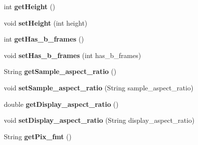 \begin{DoxyCompactItemize}
\item 
\hypertarget{classjson__objects_1_1_stream_a669b415d3fb5ae8a5c66bc0f460f10ef}{
int {\bfseries getHeight} ()}
\label{classjson__objects_1_1_stream_a669b415d3fb5ae8a5c66bc0f460f10ef}

\item 
\hypertarget{classjson__objects_1_1_stream_a0e166e17742eb929b1639e8476358048}{
void {\bfseries setHeight} (int height)}
\label{classjson__objects_1_1_stream_a0e166e17742eb929b1639e8476358048}

\item 
\hypertarget{classjson__objects_1_1_stream_a7ab7426c7256cac9f39df5bab45dcfd7}{
int {\bfseries getHas\_\-b\_\-frames} ()}
\label{classjson__objects_1_1_stream_a7ab7426c7256cac9f39df5bab45dcfd7}

\item 
\hypertarget{classjson__objects_1_1_stream_a0a262d5a8d253d92c65e2555ed3af657}{
void {\bfseries setHas\_\-b\_\-frames} (int has\_\-b\_\-frames)}
\label{classjson__objects_1_1_stream_a0a262d5a8d253d92c65e2555ed3af657}

\item 
\hypertarget{classjson__objects_1_1_stream_a18d2ee00376a811e9dbd370078a068b6}{
String {\bfseries getSample\_\-aspect\_\-ratio} ()}
\label{classjson__objects_1_1_stream_a18d2ee00376a811e9dbd370078a068b6}

\item 
\hypertarget{classjson__objects_1_1_stream_a1c2eb6d4f22435818bae44032cceb6d5}{
void {\bfseries setSample\_\-aspect\_\-ratio} (String sample\_\-aspect\_\-ratio)}
\label{classjson__objects_1_1_stream_a1c2eb6d4f22435818bae44032cceb6d5}

\item 
\hypertarget{classjson__objects_1_1_stream_a4998ab7cecc37a3312eae2344a601768}{
double {\bfseries getDisplay\_\-aspect\_\-ratio} ()}
\label{classjson__objects_1_1_stream_a4998ab7cecc37a3312eae2344a601768}

\item 
\hypertarget{classjson__objects_1_1_stream_a3e43c0758db8edf15bc1b256d3a0adab}{
void {\bfseries setDisplay\_\-aspect\_\-ratio} (String display\_\-aspect\_\-ratio)}
\label{classjson__objects_1_1_stream_a3e43c0758db8edf15bc1b256d3a0adab}

\item 
\hypertarget{classjson__objects_1_1_stream_a8e233b0133d2b5b01327862c81fd3321}{
String {\bfseries getPix\_\-fmt} ()}
\label{classjson__objects_1_1_stream_a8e233b0133d2b5b01327862c81fd3321}


\end{DoxyCompactItemize}
